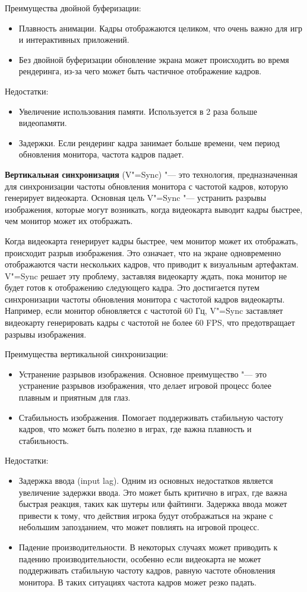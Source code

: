 Преимущества двойной буферизации:
\begin{itemize}
    \item Плавность анимации. Кадры отображаются целиком, что очень важно для игр и интерактивных приложений.
    \item Без двойной буферизации обновление экрана может происходить во время рендеринга, из-за чего может быть частичное отображение кадров.
\end{itemize}

Недостатки:
\begin{itemize}
    \item Увеличение использования памяти. Используется в 2 раза больше видеопамяти.
    \item Задержки. Если рендеринг кадра занимает больше времени, чем период обновления монитора, частота кадров падает.
\end{itemize}

\textbf{Вертикальная синхронизация} (V"=Sync) "--- это технология, предназначенная для синхронизации частоты обновления монитора с частотой кадров, которую генерирует видеокарта. Основная цель V"=Sync "--- устранить разрывы изображения, которые могут возникать, когда видеокарта выводит кадры быстрее, чем монитор может их отображать.

Когда видеокарта генерирует кадры быстрее, чем монитор может их отображать, происходит разрыв изображения. Это означает, что на экране одновременно отображаются части нескольких кадров, что приводит к визуальным артефактам. V"=Sync решает эту проблему, заставляя видеокарту ждать, пока монитор не будет готов к отображению следующего кадра. Это достигается путем синхронизации частоты обновления монитора с частотой кадров видеокарты. Например, если монитор обновляется с частотой 60 Гц, V"=Sync заставляет видеокарту генерировать кадры с частотой не более 60 FPS, что предотвращает разрывы изображения.

Преимущества вертикальной синхронизации:
\begin{itemize}
    \item Устранение разрывов изображения. Основное преимущество "--- это устранение разрывов изображения, что делает игровой процесс более плавным и приятным для глаз.
    \item Стабильность изображения. Помогает поддерживать стабильную частоту кадров, что может быть полезно в играх, где важна плавность и стабильность.
\end{itemize}

Недостатки:
\begin{itemize}
    \item Задержка ввода (input lag). Одним из основных недостатков является увеличение задержки ввода. Это может быть критично в играх, где важна быстрая реакция, таких как шутеры или файтинги. Задержка ввода может привести к тому, что действия игрока будут отображаться на экране с небольшим запозданием, что может повлиять на игровой процесс.
    \item Падение производительности. В некоторых случаях может приводить к падению производительности, особенно если видеокарта не может поддерживать стабильную частоту кадров, равную частоте обновления монитора. В таких ситуациях частота кадров может резко падать.
\end{itemize}